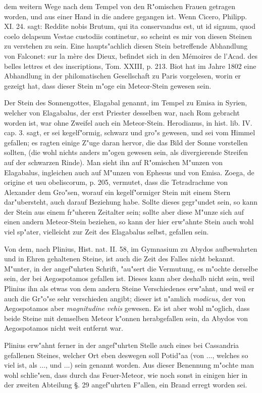 \documentclass[a4paper, 11pt, oneside, polutonikogreek, german]{article}
\begin{document}
dem weitern Wege nach dem Tempel von den R"omischen Frauen getragen worden, und aus einer Hand in die andere gegangen ist. Wenn Cicero, Philipp. XI. 24. sagt: Reddite nobis Brutum, qui ita conservandus est, ut id signum, quod coelo delapsum Vestae custodiis continetur, so scheint es mir von diesen Steinen zu verstehen zu sein. Eine haupts"achlich diesen Stein betreffende Abhandlung von Falconet: sur la mère des Dieux, befindet sich in den Mémoires de l'Acad. des belles lettres et des inscriptions, Tom. XXIII, p. 213. Biot hat im Jahre 1802 eine Abhandlung in der philomatischen Gesellschaft zu Paris vorgelesen, worin er gezeigt hat, dass dieser Stein m"oge ein Meteor-Stein gewesen sein.

Der Stein des Sonnengottes, Elagabal genannt, im Tempel zu Emisa in Syrien, welcher von Elagabalus, der erst Priester desselben war, nach Rom gebracht worden ist, war ohne Zweifel auch ein Meteor-Stein. Herodianus, in hist. lib. IV. cap. 3. sagt, er sei kegelf"ormig, schwarz und gro"s gewesen, und sei vom Himmel gefallen; es ragten einige Z"uge daran hervor, die das Bild der Sonne vorstellen sollten, (die wohl nichts anders m"ogen gewesen sein, als divergierende Streifen auf der schwarzen Rinde). Man sieht ihn auf R"omischen M"unzen von Elagabalus, ingleichen auch auf M"unzen von Ephesus und von Emisa. Zoega, de origine et usu obeliscorum, p. 205, vermutet, dass die Tetradrachme von Alexander dem Gro"sen, worauf ein kegelf"ormiger Stein mit einem Stern dar"ubersteht, auch darauf Beziehung habe. Sollte dieses gegr"undet sein, so kann der Stein aus einem fr"uheren Zeitalter sein; sollte aber diese M"unze sich auf einen andern Meteor-Stein beziehen, so kann der hier erw"ahnte Stein auch wohl viel sp"ater, vielleicht zur Zeit des Elagabalus selbst, gefallen sein.

Von dem, nach Plinius, Hist. nat. II. 58, im Gymnasium zu Abydos aufbewahrten und in Ehren gehaltenen Steine, ist auch die Zeit des Falles nicht bekannt. M"unter, in der angef"uhrten Schrift, "au"sert die Vermutung, es m"ochte derselbe sein, der bei Aegospotamos gefallen ist. Dieses kann aber deshalb nicht sein, weil Plinius ihn als etwas von dem andern Steine Verschiedenes erw"ahnt, und weil er auch die Gr"o"se sehr verschieden angibt; dieser ist n"amlich \emph{modicus}, der von Aegospotamos aber \emph{magnitudine vehis} gewesen. Es ist aber wohl m"oglich, dass beide Steine mit demselben Meteor k"onnen herabgefallen sein, da Abydos von Aegospotamos nicht weit entfernt war.

Plinius erw"ahnt ferner in der angef"uhrten Stelle auch eines bei Cassandria gefallenen Steines, welcher Ort eben deswegen soll Potid"aa (von ..., welches so viel ist, als ..., und ...) sein genannt worden. Aus dieser Benennung m"ochte man wohl schlie"sen, dass durch das Feuer-Meteor, wie noch sonst in einigen hier in der zweiten Abteilung §. 29 angef"uhrten F"allen, ein Brand erregt worden sei.
\end{document}
